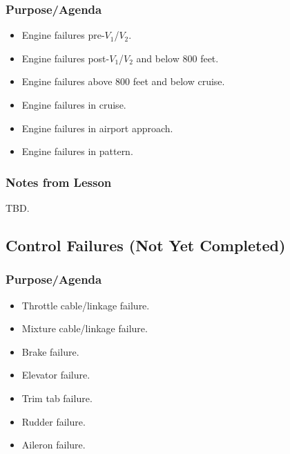 \documentclass[letterpaper,10pt,titlepage]{article}
\begin{document}

\subsubsection{Purpose/Agenda}
\label{sfle0:sefa0:spov0}

\begin{itemize}
\item Engine failures pre-$V_1$/$V_2$.
\item Engine failures post-$V_1$/$V_2$ and below 800 feet.
\item Engine failures above 800 feet and below cruise.
\item Engine failures in cruise.
\item Engine failures in airport approach.
\item Engine failures in pattern.
\end{itemize}


\subsubsection{Notes from Lesson}
\label{sfle0:sefa0:snff0}

TBD.


\subsection{Control Failures (Not Yet Completed)}
\label{sfle0:scfa0}



\subsubsection{Purpose/Agenda}
\label{sfle0:scfa0:spov0}

\begin{itemize}
\item Throttle cable/linkage failure.
\item Mixture cable/linkage failure.
\item Brake failure.
\item Elevator failure.
\item Trim tab failure.
\item Rudder failure.
\item Aileron failure.
\end{itemize}
\end{document}
